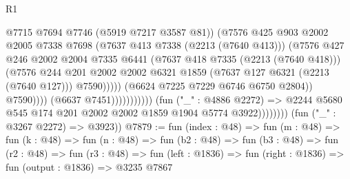 \begin{lexlean}{R1}
\begin{coremodule}
                                                        @7715
                                                        @7694
                                                        @7746
                                                        (@5919 @7217 @3587 @81))
                                                      (@7576
                                                        @425
                                                        @903
                                                        @2002
                                                        @2005
                                                        @7338
                                                        @7698
                                                        (@7637 @413 @7338 (@2213 (@7640 @413)))
                                                        (@7576
                                                          @427
                                                          @246
                                                          @2002
                                                          @2004
                                                          @7335
                                                          @6441
                                                          (@7637 @418 @7335 (@2213 (@7640 @418)))
                                                          (@7576
                                                            @244
                                                            @201
                                                            @2002
                                                            @2002
                                                            @6321
                                                            @1859
                                                            (@7637 @127 @6321 (@2213 (@7640 @127)))
                                                            @7590)))))
                                                  (@6624 @7225 @7229 @6746 @6750 @2804))
                                                @7590))))
                                        (@6637 @7451)))))))))))
                    (fun ("_" : @4886 @2272) =>
                    @2244 @5680 @545 @174 @201 @2002 @2002 @1859 @1904 @5774 @3922))))))))
      (fun ("_" : @3267 @2272) => @3923))
@7879 := fun (index : @48) =>
  fun (m : @48) =>
  fun (k : @48) =>
  fun (n : @48) =>
  fun (b2 : @48) =>
  fun (b3 : @48) =>
  fun (r2 : @48) =>
  fun (r3 : @48) => fun (left : @1836) => fun (right : @1836) => fun (output : @1836) => @3235 @7867

\end{coremodule}
\end{lexlean}
